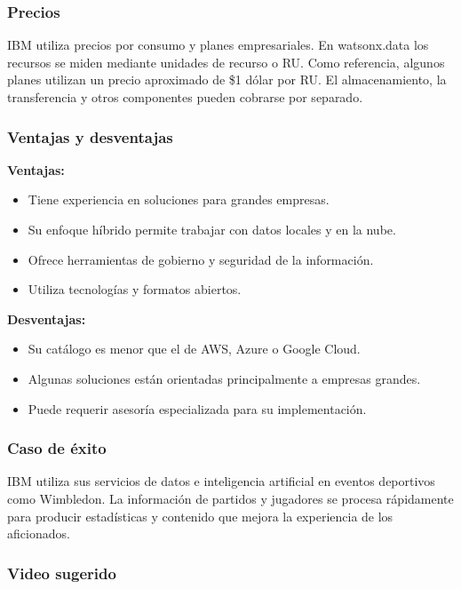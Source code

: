 \subsubsection*{Precios}

IBM utiliza precios por consumo y planes empresariales. En watsonx.data los
recursos se miden mediante unidades de recurso o RU. Como referencia, algunos
planes utilizan un precio aproximado de \$1 dólar por RU. El almacenamiento,
la transferencia y otros componentes pueden cobrarse por separado.

\subsubsection*{Ventajas y desventajas}

\textbf{Ventajas:}

\begin{itemize}
    \item Tiene experiencia en soluciones para grandes empresas.
    \item Su enfoque híbrido permite trabajar con datos locales y en la nube.
    \item Ofrece herramientas de gobierno y seguridad de la información.
    \item Utiliza tecnologías y formatos abiertos.
\end{itemize}

\textbf{Desventajas:}

\begin{itemize}
    \item Su catálogo es menor que el de AWS, Azure o Google Cloud.
    \item Algunas soluciones están orientadas principalmente a empresas grandes.
    \item Puede requerir asesoría especializada para su implementación.
\end{itemize}

\subsubsection*{Caso de éxito}

IBM utiliza sus servicios de datos e inteligencia artificial en eventos
deportivos como Wimbledon. La información de partidos y jugadores se procesa
rápidamente para producir estadísticas y contenido que mejora la experiencia
de los aficionados.

\subsubsection*{Video sugerido}


